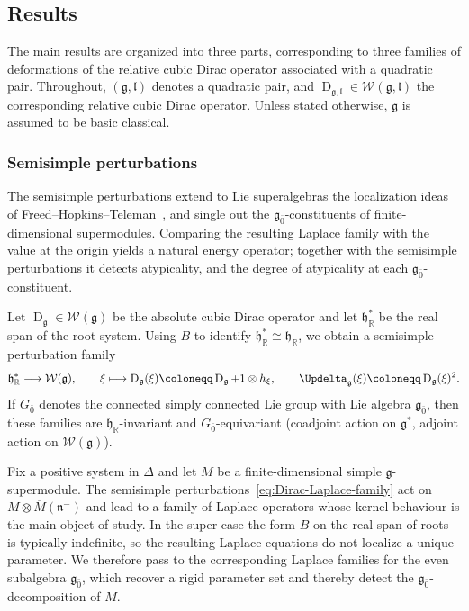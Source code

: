 \documentclass[11pt]{amsart}
\newcommand{\Dirac}{\operatorname{D}}
\def\WW{{\mathcal{W}}}
\def\Weil{{\mathcal{W}(\gg)}}
\def\RR{{\mathbb R}}
\def\hh{{\mathfrak h}}
\def\ll{{\mathfrak l}}
\def\even{{\mathfrak{g}_{\bar{0}}}}
\def\nn {{\mathfrak{n}}}
\def\gg{{\mathfrak{g}}}
\theoremstyle{plain}
\theoremstyle{remark}
\theoremstyle{definition}
\numberwithin{equation}{section}
\theoremstyle{remark}
\begin{document}
\subsection{Results}
The main results are organized into three parts, corresponding to three families of deformations of the relative cubic Dirac operator associated with a quadratic pair. Throughout, $(\gg,\ll)$ denotes a quadratic pair, and $\Dirac_{\gg,\ll}\in\WW(\gg,\ll)$ the corresponding relative cubic Dirac operator. Unless stated otherwise, $\gg$ is assumed to be basic classical.

\subsubsection{Semisimple perturbations} The semisimple perturbations extend to Lie superalgebras the localization ideas of Freed--Hopkins--Teleman~\cite{FT2}, and single out the $\even$-constituents of finite-dimensional supermodules. Comparing the resulting Laplace family with the value at the origin yields a natural energy operator; together with the semisimple perturbations it detects atypicality, and the degree of atypicality at each \(\even\)-constituent.

Let $\Dirac_{\gg}\in\Weil$ be the absolute cubic Dirac operator and let $\hh_{\RR}^{\ast}$ be the real span of the root system. Using $B$ to identify $\hh_{\RR}^{\ast}\cong \hh_{\RR}$, we obtain a semisimple perturbation family
\begin{equation}\label{eq:Dirac-Laplace-family}
\hh_{\RR}^{\ast}\longrightarrow \Weil,\qquad
\xi\longmapsto \Dirac_{\gg}(\xi)\coloneqq \Dirac_{\gg}+1\otimes h_{\xi},\qquad \Updelta_{\gg}(\xi)\coloneqq \Dirac_{\gg}(\xi)^{2}.
\end{equation}
If $G_{\bar 0}$ denotes the connected simply connected Lie group with Lie algebra $\even$, then these families are $\hh_{\RR}$-invariant and $G_{\bar 0}$-equivariant (coadjoint action on $\gg^{\ast}$, adjoint action on $\Weil$).

Fix a positive system in $\Delta$ and let $M$ be a finite-dimensional simple $\gg$-supermodule. The semisimple perturbations~\eqref{eq:Dirac-Laplace-family} act on $M\otimes \overline{M}(\nn^{-})$ and lead to a family of Laplace operators whose kernel behaviour is the main object of study. In the super case the form $B$ on the real span of roots is typically indefinite, so the resulting Laplace equations do not localize a unique parameter. We therefore pass to the corresponding Laplace families for the even subalgebra $\even$, which recover a rigid parameter set and thereby detect the $\even$-decomposition of $M$.
\end{document}
